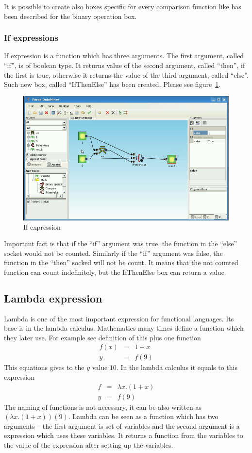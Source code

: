 \documentclass[a4paper,12pt]{book}
\begin{document}
It is possible to create also boxes specific for every comparison function like has been described for the binary operation box.

\subsubsection{If expressions}
If expression is a function which has three arguments. The first argument, called ``if'', is of boolean type. It returns value of the second argument, called ``then'', if the first is true, otherwise it returns the value of the third argument, called ``else''. Such new box, called ``IfThenElse'' has been created. Please see figure~\ref{fig:boxIfThenElse}.
\begin{figure}
\includegraphics[width=1\textwidth]{ifthenelse2.png}
	\caption{If expression}
	\label{fig:boxIfThenElse}
\end{figure}

Important fact is that if the ``if'' argument was true, the function in the ``else'' socket would not be counted. Similarly if the ``if'' argument was false, the function in the ``then'' socked will not be count. It means that the not counted function can count indefinitely, but the IfThenElse box can return a value.

\subsection{Lambda expression}
Lambda is one of the most important expression for functional languages. Its base is in the lambda calculus. Mathematics many times define a function which they later use. For example see definition of this plus one function
\begin{eqnarray*}
f(x)&=&1 + x\\
y&=&f(9)
\end{eqnarray*}
This equations gives to the $y$ value $10$. In the lambda calculus it equals to this expression
\begin{eqnarray*}
f&=&\lambda x.(1+x)\\
y&=&f(9)
\end{eqnarray*}
The naming of functions is not necessary, it can be also written as $(\lambda x.(1+x))(9)$. Lambda can be seen as a function which has two arguments -- the first argument is set of variables and the second argument is a expression which uses these variables. It returns a function from the variables to the value of the expression after setting up the variables.
\end{document}
